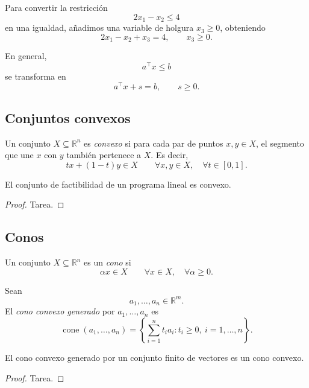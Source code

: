 Para convertir la restricción
\[
    2x_1-x_2\leq 4
\]
en una igualdad, añadimos una variable de holgura \(x_3\geq 0\), obteniendo
\[
    2x_1-x_2+x_3=4,
    \qquad
    x_3\geq 0.
\]

En general,
\[
    a^\top x\leq b
\]
se transforma en
\[
    a^\top x+s=b,
    \qquad
    s\geq 0.
\]

\subsection{Conjuntos convexos}

\begin{definition}
Un conjunto \(X\subseteq\mathbb{R}^n\) es \emph{convexo} si para cada par de puntos \(x,y\in X\), el segmento que une \(x\) con \(y\) también pertenece a \(X\). Es decir,
\[
    tx+(1-t)y\in X
    \qquad
    \forall x,y\in X,\quad \forall t\in[0,1].
\]
\end{definition}

\begin{proposition}
El conjunto de factibilidad de un programa lineal es convexo.
\end{proposition}

\begin{proof}
Tarea.
\end{proof}

\subsection{Conos}

\begin{definition}[Cono]
Un conjunto \(X\subseteq\mathbb{R}^n\) es un \emph{cono} si
\[
    \alpha x\in X
    \qquad
    \forall x\in X,\quad \forall \alpha\geq 0.
\]
\end{definition}

\begin{definition}
Sean
\[
    a_1,\dots,a_n\in\mathbb{R}^m.
\]
El \emph{cono convexo generado} por \(a_1,\dots,a_n\) es
\[
    \operatorname{cone}(a_1,\dots,a_n)
    =
    \left\{
        \sum_{i=1}^{n}t_i a_i:
        t_i\geq 0,\ i=1,\dots,n
    \right\}.
\]
\end{definition}

\begin{proposition}
El cono convexo generado por un conjunto finito de vectores es un cono convexo.
\end{proposition}

\begin{proof}
Tarea.
\end{proof}

